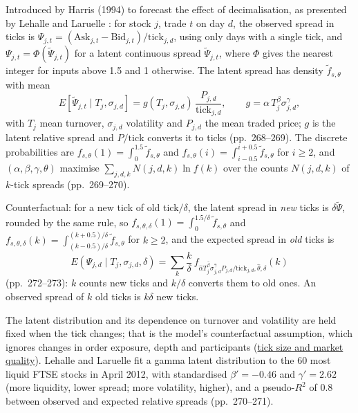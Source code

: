 \begin{qfmodel}\label{mod:harris-discretised-spread}
 Introduced by Harris (1994) to forecast the effect of decimalisation, as presented by Lehalle and Laruelle \citep[app.~A, sec.~A.6, pp.~266--268]{alpha-laruelle}: for stock $j$, trade $t$ on day $d$, the observed spread in ticks is $\Psi_{j,t}=(\mathrm{Ask}_{j,t}-\mathrm{Bid}_{j,t})/\mathrm{tick}_{j,d}$, using only days with a single tick, and $\Psi_{j,t}=\Phi(\tilde\Psi_{j,t})$ for a latent continuous spread $\tilde\Psi_{j,t}$, where $\Phi$ gives the nearest integer for inputs above 1.5 and 1 otherwise. The latent spread has density $\tilde f_{s,\theta}$ with mean
\[ E[\tilde\Psi_{j,t}\mid T_j,\sigma_{j,d}]=g(T_j,\sigma_{j,d})\,\frac{P_{j,d}}{\mathrm{tick}_{j,d}},\qquad g=\alpha\,T_j^{\beta}\sigma_{j,d}^{\gamma}, \]
with $T_j$ mean turnover, $\sigma_{j,d}$ volatility and $P_{j,d}$ the mean traded price; $g$ is the latent relative spread and $P/\mathrm{tick}$ converts it to ticks (pp.~268--269). The discrete probabilities are $f_{s,\theta}(1)=\int_0^{1.5}\tilde f_{s,\theta}$ and $f_{s,\theta}(i)=\int_{i-0.5}^{i+0.5}\tilde f_{s,\theta}$ for $i\ge2$, and $(\alpha,\beta,\gamma,\theta)$ maximise $\sum_{j,d,k}N(j,d,k)\ln f(k)$ over the counts $N(j,d,k)$ of $k$-tick spreads (pp.~269--270).

 Counterfactual: for a new tick of old tick$/\delta$, the latent spread in \emph{new} ticks is $\delta\tilde\Psi$, rounded by the same rule, so $f_{s,\theta,\delta}(1)=\int_0^{1.5/\delta}\tilde f_{s,\theta}$ and $f_{s,\theta,\delta}(k)=\int_{(k-0.5)/\delta}^{(k+0.5)/\delta}\tilde f_{s,\theta}$ for $k\ge2$, and the expected spread in \emph{old} ticks is
\[ E(\Psi_{j,d}\mid T_j,\sigma_{j,d},\delta)=\sum_k\frac k\delta\,f_{\hat\alpha T_j^{\hat\beta}\sigma_{j,d}^{\hat\gamma}P_{j,d}/\mathrm{tick}_{j,d},\hat\theta,\delta}(k) \]
(pp.~272--273): $k$ counts new ticks and $k/\delta$ converts them to old ones. An observed spread of $k$ old ticks is $k\delta$ new ticks.

 The latent distribution and its dependence on turnover and volatility are held fixed when the tick changes; that is the model's counterfactual assumption, which ignores changes in order exposure, depth and participants (\hyperref[ev:tick-size-market-quality]{tick size and market quality}). Lehalle and Laruelle fit a gamma latent distribution to the 60 most liquid FTSE stocks in April 2012, with standardised $\beta'=-0.46$ and $\gamma'=2.62$ (more liquidity, lower spread; more volatility, higher), and a pseudo-$R^2$ of 0.8 between observed and expected relative spreads (pp.~270--271).


\end{qfmodel}
